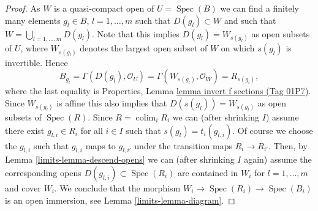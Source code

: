 \documentclass{amsart}
\theoremstyle{plain}
\theoremstyle{definition}
\theoremstyle{remark}
\numberwithin{equation}{subsection}
\def\colim{\mathop{\mathrm{colim}}\nolimits}
\def\Spec{\mathop{\mathrm{Spec}}}
\begin{document}
\begin{proof}
\medskip\noindent
As $W$ is a quasi-compact open of $U = \Spec(B)$
we can find a finitely many elements $g_l \in B$, $l = 1, \ldots, m$
such that $D(g_l) \subset W$ and such that
$W = \bigcup_{l = 1, \ldots, m} D(g_l)$.
Note that this implies $D(g_l) = W_{s(g_l)}$ as open subsets of $U$,
where $W_{s(g_l)}$ denotes the largest open subset of $W$ on which
$s(g_l)$ is invertible. Hence
$$
B_{g_l} =
\Gamma(D(g_l), \mathcal{O}_U) =
\Gamma(W_{s(g_l)}, \mathcal{O}_W) = R_{s(g_l)},
$$
where the last equality is
Properties, Lemma \href{https://stacks.math.columbia.edu/tag/01P7}{lemma invert f sections (Tag 01P7)}.
Since $W_{s(g_l)}$ is affine this also
implies that $D(s(g_l)) = W_{s(g_l)}$ as open subsets of $\Spec(R)$.
Since $R = \colim_i R_i$ we can (after shrinking $I$)
assume there exist $g_{l, i} \in R_i$ for all $i \in I$ such that
$s(g_l) = t_i(g_{l, i})$. Of course we choose the $g_{l, i}$
such that $g_{l, i}$ maps to $g_{l, i'}$ under the transition maps
$R_i \to R_{i'}$. Then, by Lemma \ref{limits-lemma-descend-opens} we can
(after shrinking $I$ again)
assume the corresponding opens $D(g_{l, i}) \subset \Spec(R_i)$
are contained in $W_i$ for $l = 1, \ldots, m$ and cover $W_i$.
We conclude that the morphism $W_i \to \Spec(R_i) \to \Spec(B_i)$
is an open immersion, see Lemma \ref{limits-lemma-diagram}.


\end{proof}
\end{document}

